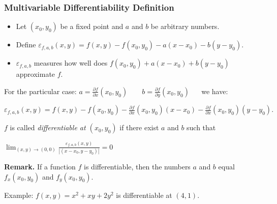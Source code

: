 \begin{frame}
\frametitle{Multivariable Differentiability Definition}

\begin{itemize}
\item Let $(x_0,y_0)$ be a fixed point and $a$ and $b$ be arbitrary numbers.
\item Define $\varepsilon_{f, a, b}(x,y) = f(x,y)- f(x_0,y_0)-a (x-x_0) -b(y-y_0)$.
\item $\varepsilon_{f, a, b}$ measures how well does $f(x_0,y_0)+a(x-x_0)+b(y-y_0)$ approximate $f$.
\end{itemize}
For the particular case: $\displaystyle a=\frac{\partial f}{\partial x}(x_0,y_0) \quad \quad b=\frac{\partial f}{\partial y}(x_0,y_0) 
$ ~~ we have:

$\displaystyle
\varepsilon_{f, a, b}(x,y) = f(x,y)- f(x_0,y_0)-\frac{\partial f}{\partial x}(x_0,y_0) (x-x_0) -\frac{\partial f}{\partial x}(x_0,y_0)(y-y_0).
$

 
\begin{definition}
$f$ is called \emph{differentiable at $(x_0,y_0)$} if there exist $a$ and $b$ such that 

\hfil \hfil$\displaystyle \lim_{(x,y)\to (0,0)}  \frac{\varepsilon_{f, a, b} (x,y)}{|(x-x_0, y-y_0)|}=0 $
\end{definition}
\textbf{Remark.} If a function $f$ is differentiable, then the numbers $a$ and $b$ equal $f_x(x_0,y_0)$ and $f_y(x_0,y_0)$.
\end{frame}

\begin{frame}
Example: $f(x,y) = x^2+xy+2y^2$ is differentiable at $(4,1)$.

\end{frame}